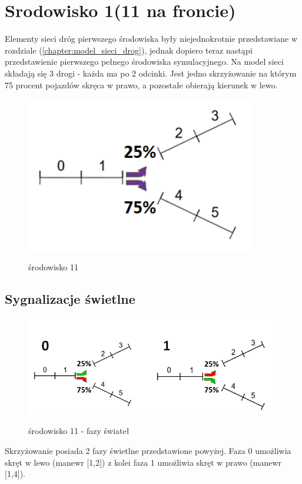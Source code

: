 \documentclass[12pt]{book}
\theoremstyle{plain}
\newcommand{\myref}[1]{(\ref{#1})}
\begin{document}
\section{Srodowisko 1(11 na froncie)}
Elementy sieci dróg pierwszego środowiska były niejednokrotnie przedstawiane w rozdziale \myref{chapter:model_sieci_drog}, jednak dopiero teraz nastąpi przedstawienie pierwszego pełnego środowiska symulacyjnego. Na model sieci składają się 3 drogi - każda ma po 2 odcinki. Jest jedno skrzyżowanie na którym 75 procent pojazdów skręca w prawo, a pozostałe obierają kierunek w lewo.
\begin{figure}[H]
	\centering
	\includegraphics[width=10cm]{images/env_11_procenty}
	\label{fig:env_11}
	\caption{środowisko 11}
\end{figure}

\subsection{Sygnalizacje świetlne}	
\begin{figure}[H]
	\centering
	\includegraphics[width=17cm]{images/env_11_fazy_procenty_no_yellow}
	\label{fig:env_11_fazy}
	\caption{środowisko 11 - fazy świateł}
\end{figure}\noindent
Skrzyżowanie posiada 2 fazy świetlne przedstawione powyżej. Faza 0 umożliwia skręt w lewo (manewr [1,2]) z kolei faza 1 umożliwia skręt w prawo (manewr [1,4]).
\end{document}
